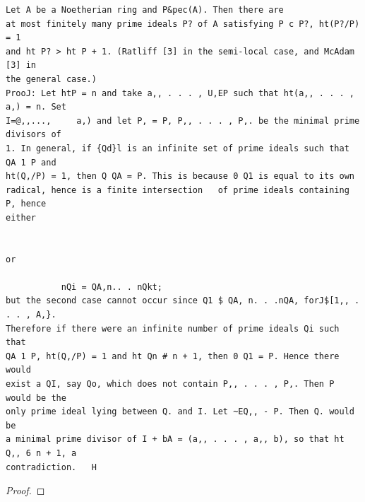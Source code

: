\begin{theorem}\label{mcrt-auto-theorem-31-1}\uses{}
\begin{verbatim}
Let A be a Noetherian ring and P&pec(A). Then there are
at most finitely many prime ideals P? of A satisfying P c P?, ht(P?/P) = 1
and ht P? > ht P + 1. (Ratliff [3] in the semi-local case, and McAdam [3] in
the general case.)
ProoJ: Let htP = n and take a,, . . . , U,EP such that ht(a,, . . . , a,) = n. Set
I=@,,...,     a,) and let P, = P, P,, . . . , P,. be the minimal prime divisors of
1. In general, if {Qd}l is an infinite set of prime ideals such that QA 1 P and
ht(Q,/P) = 1, then Q QA = P. This is because 0 Q1 is equal to its own
radical, hence is a finite intersection   of prime ideals containing    P, hence
either


or

           nQi = QA,n.. . nQkt;
but the second case cannot occur since Q1 $ QA, n. . .nQA, forJ$[1,, . . . , A,}.
Therefore if there were an infinite number of prime ideals Qi such that
QA 1 P, ht(Q,/P) = 1 and ht Qn # n + 1, then 0 Q1 = P. Hence there would
exist a QI, say Qo, which does not contain P,, . . . , P,. Then P would be the
only prime ideal lying between Q. and I. Let ~EQ,, - P. Then Q. would be
a minimal prime divisor of I + bA = (a,, . . . , a,, b), so that ht Q,, 6 n + 1, a
contradiction.   H
\end{verbatim}
\end{theorem}
\begin{proof}
\notready
\end{proof}


